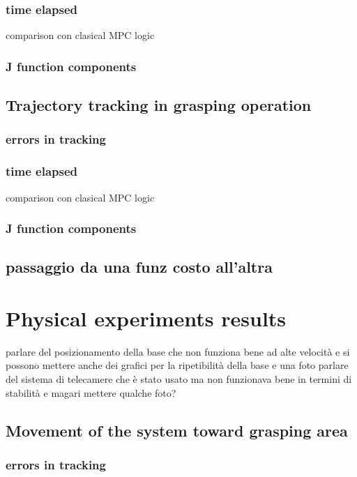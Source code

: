 		\subsubsection{time elapsed}
			comparison con clasical MPC logic
		\subsubsection{J function components}

	\subsection{Trajectory tracking in grasping operation}

		\subsubsection{errors in tracking}
			
		\subsubsection{time elapsed}
			comparison con clasical MPC logic
		\subsubsection{J function components}
		
		\subsection{passaggio da una funz costo all'altra}
	
\section{Physical experiments results}
	parlare del posizionamento della base che non funziona bene ad alte velocità e si possono mettere anche dei grafici per la ripetibilità della base e una foto
	parlare del sistema di telecamere che è stato usato ma non funzionava bene in termini di stabilità e magari mettere qualche foto?
	\subsection{Movement of the system toward grasping area}

		\subsubsection{errors in tracking}
			
